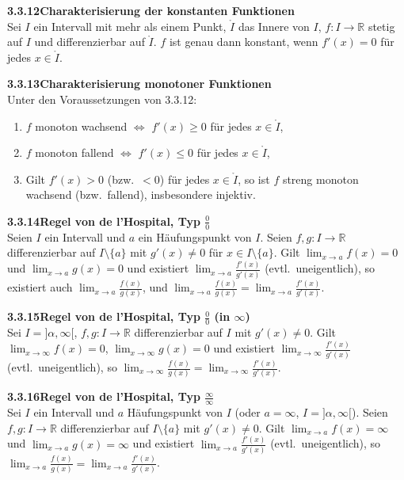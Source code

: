 \documentclass[a4paper,12pt]{article}
\newcommand{\gentry}[3]{%
  \noindent\textbf{#1\quad #2}\nopagebreak\\[0.2em]
  #3\par\smallskip
}
\begin{document}
\gentry{3.3.12}{Charakterisierung der konstanten Funktionen}{%
  Sei $I$ ein Intervall mit mehr als einem Punkt, $\mathring I$ das Innere von $I$,
  $f : I \to \mathbb{R}$ stetig auf $I$ und differenzierbar auf $\mathring I$.
  $f$ ist genau dann konstant, wenn $f'(x) = 0$ f\"ur jedes $x \in \mathring I$.
}

\gentry{3.3.13}{Charakterisierung monotoner Funktionen}{%
  Unter den Voraussetzungen von 3.3.12:
  \begin{enumerate}[label=(\roman*),topsep=2pt,itemsep=1pt]
    \item $f$ monoton wachsend $\Leftrightarrow$ $f'(x) \geq 0$ f\"ur jedes $x \in \mathring I$,
    \item $f$ monoton fallend $\Leftrightarrow$ $f'(x) \leq 0$ f\"ur jedes $x \in \mathring I$,
    \item Gilt $f'(x) > 0$ (bzw.\ $<0$) f\"ur jedes $x \in \mathring I$, so ist $f$
          streng monoton wachsend (bzw.\ fallend), insbesondere injektiv.
  \end{enumerate}
}

\gentry{3.3.14}{Regel von de l'Hospital, Typ $\tfrac{0}{0}$}{%
  Seien $I$ ein Intervall und $a$ ein H\"aufungspunkt von $I$. Seien $f, g : I \to \mathbb{R}$
  differenzierbar auf $I \setminus \{a\}$ mit $g'(x) \neq 0$ f\"ur $x \in I \setminus \{a\}$.
  Gilt $\lim_{x \to a} f(x) = 0$ und $\lim_{x \to a} g(x) = 0$ und existiert
  $\lim_{x \to a} \tfrac{f'(x)}{g'(x)}$ (evtl.\ uneigentlich), so existiert auch
  $\lim_{x \to a} \tfrac{f(x)}{g(x)}$, und
  $\lim_{x \to a} \tfrac{f(x)}{g(x)} = \lim_{x \to a} \tfrac{f'(x)}{g'(x)}$.
}

\gentry{3.3.15}{Regel von de l'Hospital, Typ $\tfrac{0}{0}$ (in $\infty$)}{%
  Sei $I = ]\alpha, \infty[$, $f, g : I \to \mathbb{R}$ differenzierbar auf $I$ mit
  $g'(x) \neq 0$. Gilt $\lim_{x \to \infty} f(x) = 0$, $\lim_{x \to \infty} g(x) = 0$ und
  existiert $\lim_{x \to \infty} \tfrac{f'(x)}{g'(x)}$ (evtl.\ uneigentlich),
  so $\lim_{x \to \infty} \tfrac{f(x)}{g(x)} = \lim_{x \to \infty} \tfrac{f'(x)}{g'(x)}$.
}

\gentry{3.3.16}{Regel von de l'Hospital, Typ $\tfrac{\infty}{\infty}$}{%
  Sei $I$ ein Intervall und $a$ H\"aufungspunkt von $I$ (oder $a = \infty$,
  $I = ]\alpha, \infty[$). Seien $f, g : I \to \mathbb{R}$ differenzierbar auf
  $I \setminus \{a\}$ mit $g'(x) \neq 0$. Gilt $\lim_{x \to a} f(x) = \infty$ und
  $\lim_{x \to a} g(x) = \infty$ und existiert $\lim_{x \to a} \tfrac{f'(x)}{g'(x)}$
  (evtl.\ uneigentlich), so $\lim_{x \to a} \tfrac{f(x)}{g(x)} = \lim_{x \to a} \tfrac{f'(x)}{g'(x)}$.
}
\end{document}
